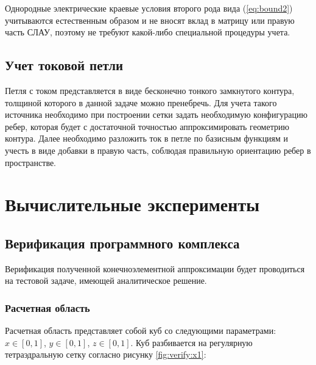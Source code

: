 \documentclass[a4paper,14pt]{article}
\makeatletter
\newcommand{\labelname}[1]{%
	\def\@currentlabelname{#1}}%
\makeatother
\begin{document}
Однородные электрические краевые условия второго рода вида (\ref{eq:bound2}) учитываются естественным образом и не вносят вклад в матрицу или правую часть СЛАУ, поэтому не требуют какой-либо специальной процедуры учета.


\subsection{Учет токовой петли}
Петля с током представляется в виде бесконечно тонкого замкнутого контура, толщиной которого в данной задаче можно пренебречь. Для учета такого источника необходимо при построении сетки задать необходимую конфигурацию ребер, которая будет с достаточной точностью аппроксимировать геометрию контура. Далее необходимо разложить ток в петле по базисным функциям и учесть в виде добавки в правую часть, соблюдая правильную ориентацию ребер в пространстве.


\clearpage
\section{Вычислительные эксперименты}
\labelname{3}\label{sec:numerical_experiments}
\subsection{Верификация программного комплекса}
Верификация полученной конечноэлементной аппроксимации будет проводиться на тестовой задаче, имеющей аналитическое решение.
\subsubsection{Расчетная область}
Расчетная область представляет собой куб со следующими параметрами: $x \in [0,1]$, $y \in [0,1]$, $z \in [0,1]$. Куб разбивается на регулярную тетраэдральную сетку согласно рисунку \ref{fig:verify:x1}:
\end{document}
